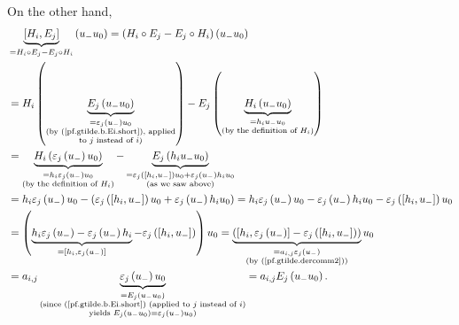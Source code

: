 \documentclass[etingof-lie.tex]{subfiles}
\begin{document}
\begin{vershort}
On the other hand,%
\begin{align*}
&  \underbrace{\left[  H_{i},E_{j}\right]  }_{=H_{i}\circ E_{j}-E_{j}\circ
H_{i}}\left(  u_{-}u_{0}\right)  =\left(  H_{i}\circ E_{j}-E_{j}\circ
H_{i}\right)  \left(  u_{-}u_{0}\right) \\
&  =H_{i}\left(  \underbrace{E_{j}\left(  u_{-}u_{0}\right)  }%
_{\substack{=\varepsilon_{j}\left(  u_{-}\right)  u_{0}\\\text{(by
(\ref{pf.gtilde.b.Ei.short}), applied}\\\text{to }j\text{ instead of
}i\text{)}}}\right)  -E_{j}\left(  \underbrace{H_{i}\left(  u_{-}u_{0}\right)
}_{\substack{=h_{i}u_{-}u_{0}\\\text{(by the definition of }H_{i}\text{)}%
}}\right) \\
&  =\underbrace{H_{i}\left(  \varepsilon_{j}\left(  u_{-}\right)
u_{0}\right)  }_{\substack{=h_{i}\varepsilon_{j}\left(  u_{-}\right)
u_{0}\\\text{(by the definition of }H_{i}\text{)}}}-\underbrace{E_{j}\left(
h_{i}u_{-}u_{0}\right)  }_{\substack{=\varepsilon_{j}\left(  \left[
h_{i},u_{-}\right]  \right)  u_{0}+\varepsilon_{j}\left(  u_{-}\right)
h_{i}u_{0}\\\text{(as we saw above)}}}\\
&  =h_{i}\varepsilon_{j}\left(  u_{-}\right)  u_{0}-\left(  \varepsilon
_{j}\left(  \left[  h_{i},u_{-}\right]  \right)  u_{0}+\varepsilon_{j}\left(
u_{-}\right)  h_{i}u_{0}\right)  =h_{i}\varepsilon_{j}\left(  u_{-}\right)
u_{0}-\varepsilon_{j}\left(  u_{-}\right)  h_{i}u_{0}-\varepsilon_{j}\left(
\left[  h_{i},u_{-}\right]  \right)  u_{0}\\
&  =\left(  \underbrace{h_{i}\varepsilon_{j}\left(  u_{-}\right)
-\varepsilon_{j}\left(  u_{-}\right)  h_{i}}_{=\left[  h_{i},\varepsilon
_{j}\left(  u_{-}\right)  \right]  }-\varepsilon_{j}\left(  \left[
h_{i},u_{-}\right]  \right)  \right)  u_{0}=\underbrace{\left(  \left[
h_{i},\varepsilon_{j}\left(  u_{-}\right)  \right]  -\varepsilon_{j}\left(
\left[  h_{i},u_{-}\right]  \right)  \right)  }_{\substack{=a_{i,j}%
\varepsilon_{j}\left(  u_{-}\right)  \\\text{(by (\ref{pf.gtilde.dercomm2}))}%
}}u_{0}\\
&  =a_{i,j}\underbrace{\varepsilon_{j}\left(  u_{-}\right)  u_{0}%
}_{\substack{=E_{j}\left(  u_{-}u_{0}\right)  \\\text{(since
(\ref{pf.gtilde.b.Ei.short}) (applied to }j\text{ instead of }i\text{)}%
\\\text{yields }E_{j}\left(  u_{-}u_{0}\right)  =\varepsilon_{j}\left(
u_{-}\right)  u_{0}\text{)}}}=a_{i,j}E_{j}\left(  u_{-}u_{0}\right)  .
\end{align*}



\end{vershort}
\end{document}

